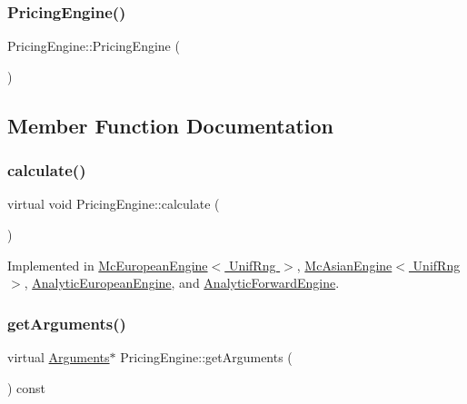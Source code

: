 \subsubsection{\texorpdfstring{Pricing\+Engine()}{PricingEngine()}}
{\footnotesize\ttfamily Pricing\+Engine\+::\+Pricing\+Engine (\begin{DoxyParamCaption}{ }\end{DoxyParamCaption})\hspace{0.3cm}{\ttfamily [inline]}}



\subsection{Member Function Documentation}
\hypertarget{class_pricing_engine_a733511ffc3cf5e4dc1fbc2a39208d8bd}{}\label{class_pricing_engine_a733511ffc3cf5e4dc1fbc2a39208d8bd} 
\subsubsection{\texorpdfstring{calculate()}{calculate()}}
{\footnotesize\ttfamily virtual void Pricing\+Engine\+::calculate (\begin{DoxyParamCaption}{ }\end{DoxyParamCaption})\hspace{0.3cm}{\ttfamily [pure virtual]}}



Implemented in \hyperlink{class_mc_european_engine_a51b2f0147fbaf2b84c65851bbc2baa7b}{Mc\+European\+Engine$<$ Unif\+Rng $>$}, \hyperlink{class_mc_asian_engine_a4e67149307de395f821c8aa07afad3b8}{Mc\+Asian\+Engine$<$ Unif\+Rng $>$}, \hyperlink{class_analytic_european_engine_adeda22c7b482779d7deaa17037195487}{Analytic\+European\+Engine}, and \hyperlink{class_analytic_forward_engine_a12d6791a13bf727d43ffcff9cb55b094}{Analytic\+Forward\+Engine}.

\hypertarget{class_pricing_engine_a399f4519f58b2ac1d108ce14d0058c97}{}\label{class_pricing_engine_a399f4519f58b2ac1d108ce14d0058c97} 
\subsubsection{\texorpdfstring{get\+Arguments()}{getArguments()}}
{\footnotesize\ttfamily virtual \hyperlink{class_pricing_engine_1_1_arguments}{Arguments}$\ast$ Pricing\+Engine\+::get\+Arguments (\begin{DoxyParamCaption}{ }\end{DoxyParamCaption}) const\hspace{0.3cm}{\ttfamily [pure virtual]}}



